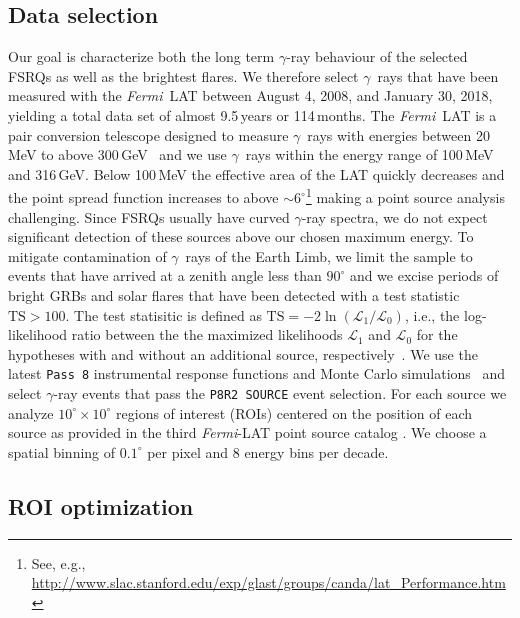\documentclass[twocolumn,linenumbers]{aastex62}
\newcommand{\Grays}{$\gamma$~rays\xspace}
\newcommand{\gray}{$\gamma$-ray\xspace}
\newcommand{\FermiLAT}{\emph{Fermi}~LAT\xspace}
\newcommand{\fermiLAT}{\emph{Fermi}-LAT\xspace}
\begin{document}
\subsection{Data selection}

Our goal is characterize both the long term \gray behaviour of the selected FSRQs as well as the brightest flares.
We therefore select \Grays that have been measured with the \FermiLAT between August 4, 2008, and January 30, 2018, yielding a total data set of almost 9.5\,years or 114\,months.
The \FermiLAT is a pair conversion telescope designed to measure \Grays with energies between 20\,MeV to above 300\,GeV~\citep{2009ApJ...697.1071A} and we 
 use \Grays within the energy range of 100\,MeV and 316\,GeV. 
Below 100\,MeV the effective area of the LAT quickly decreases and the point spread function increases to above $\sim 6^\circ$\footnote{See, e.g., \url{http://www.slac.stanford.edu/exp/glast/groups/canda/lat_Performance.htm}} making a point source analysis challenging. 
Since FSRQs usually have curved \gray spectra, we do not expect significant detection of these sources above our chosen maximum energy.
To mitigate contamination of \Grays of the Earth Limb, we limit the sample to events that have arrived at a zenith angle less than $90^\circ$ and we excise periods of bright GRBs and solar flares that have been detected with a test statistic $\mathrm{TS} > 100$.
The test statisitic is defined as $\mathrm{TS} = -2\ln(\mathcal{L}_1 / \mathcal{L}_0)$, i.e., the log-likelihood ratio between the the maximized likelihoods $\mathcal{L}_1$ and $\mathcal{L}_0$ for the hypotheses with and without an additional source, respectively~\citep{mattox1996}.
We use the latest \texttt{Pass 8} instrumental response functions and Monte Carlo simulations~\citep{pass8} and select \gray events that pass the \texttt{P8R2 SOURCE} event selection. 
For each source we analyze $10^\circ \times 10^\circ$ regions of interest (ROIs) centered on the position of each source as provided in the third \fermiLAT point source catalog \citep[3FGL,][]{3fgl}.
We choose a spatial binning of $0.1^\circ$ per pixel and 8 energy bins per decade. 

\subsection{ROI optimization}
\label{sec:roi}
\end{document}
